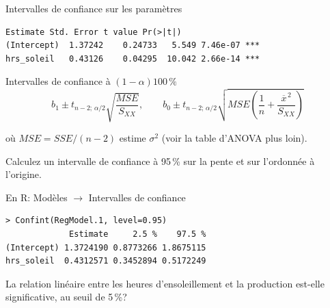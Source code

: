 \documentclass{BeamerTemplate}
\begin{document}
\begin{frame}[fragile,t]{Intervalles de confiance sur les paramètres}

\begin{Verbatim}[fontsize=\scriptsize]
            Estimate Std. Error t value Pr(>|t|)
(Intercept)  1.37242    0.24733   5.549 7.46e-07 ***
hrs_soleil   0.43126    0.04295  10.042 2.66e-14 ***
\end{Verbatim}

\begin{Boite}{Intervalles de confiance à $(1-\alpha)100\,\%$}
\[
b_1\pm t_{n-2;\,\alpha/2}\sqrt{\frac{MSE}{S_{XX}}},\qquad
b_0\pm t_{n-2;\,\alpha/2}\sqrt{MSE\left(\frac1n+\frac{\overline{x}^{\,2}}{S_{XX}}\right)}
\]
\end{Boite}
{\small où $MSE=SSE/(n-2)$ estime $\sigma^2$ (voir la table d'ANOVA plus loin).}


Calculez un intervalle de confiance à 95\,\% sur la pente et sur l'ordonnée à
l'origine.

\end{frame}

\begin{frame}[fragile,t]{En R: \textsf{Modèles} $\rightarrow$ \textsf{Intervalles de confiance}}

\begin{Verbatim}[fontsize=\small]
> Confint(RegModel.1, level=0.95)
             Estimate     2.5 %    97.5 %
(Intercept) 1.3724190 0.8773266 1.8675115
hrs_soleil  0.4312571 0.3452894 0.5172249
\end{Verbatim}

\bigskip
La relation linéaire entre les heures d'ensoleillement et la production
est-elle significative, au seuil de 5\,\%?
\vspace{2cm}

\end{frame}
\end{document}

